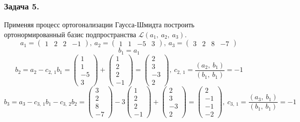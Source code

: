 \documentclass[12pt, letterpaper, twoside]{article}
\begin{document}
        \subsubsection*{Задача 5.}
        Применяя процесс ортогонализации Гаусса-Шмидта построить ортонормированный базис подпространства $\mathcal{L}(a_1,\ a_2,\ a_3)$.
        \[a_1 = \begin{pmatrix}
            1 & 2 & 2 & -1
        \end{pmatrix},\ a_2 = \begin{pmatrix}
            1 & 1 & -5 & 3
        \end{pmatrix},\ a_3 = \begin{pmatrix}
            3 & 2 & 8 & -7
        \end{pmatrix}\]
        \[b_1 = a_1\]
        \[b_2 = a_2 - c_{2,\ 1}b_1 = \begin{pmatrix}
            1\\1\\-5\\3
        \end{pmatrix} + \begin{pmatrix}
            1\\2\\2\\-1
        \end{pmatrix} = \begin{pmatrix}
            2\\3\\-3\\2
        \end{pmatrix},\ c_{2,\ 1} = \frac{(a_2,\ b_1)}{(b_1,\ b_1)} = -1\]
        \[b_3 = a_3 - c_{3,\ 1}b_1 - c_{3,\ 2}b_2 = \begin{pmatrix}
            3\\2\\8\\-7
        \end{pmatrix} - 3\begin{pmatrix}
            1\\2\\2\\-1
        \end{pmatrix} + \begin{pmatrix}
            2\\3\\-3\\2
        \end{pmatrix} = \begin{pmatrix}
            2\\-1\\-1\\-2
        \end{pmatrix},\ c_{3,\ 1} = \frac{(a_3,\ b_1)}{(b_1,\ b_1)} = -1\]
\end{document}
